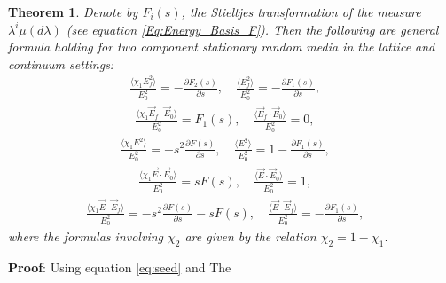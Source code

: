 \documentclass[english,12pt,jmp,graphicx]{revtex4-1}
\newtheorem{theorem}{Theorem}[section]
\begin{document}
% 
\begin{theorem}\label{thm:Herglotz_Decomp_Energy}
   Denote by $F_i(s)$, the Stieltjes transformation of the measure
   $\lambda^i\mu(d\lambda)$ (see equation \eqref{Eq:Energy_Basis_F}). Then the
   following are general formula holding for two component stationary  
   random media in the lattice and continuum settings: 
%
  \begin{align}\label{eq:Ed2_Energy_Partitions_Ef2}
  \frac{\langle\chi_1E_f^2\rangle}{E_0^2}=-\frac{\partial F_2(s)}{\partial s},   \quad
  \frac{\langle E_f^2\rangle}{E_0^2}=-\frac{\partial F_1(s)}{\partial s}, \quad
\end{align}  
%
  \begin{align}\label{eq:Ed2_Energy_Partitions_Ef*E0}
  \frac{ \langle\chi_1\vec{E}_f\cdot\vec{E}_0\rangle}{E_0^2}=F_1(s), \quad
  \frac{ \langle\vec{E}_f\cdot\vec{E}_0\rangle}{E_0^2}=0, \quad
  \end{align}
%
  \begin{align}\label{eq:Ed2_Energy_Partitions_E2}
   \frac{\langle\chi_1E^2\rangle}{E_0^2}=-s^2\frac{\partial F(s)}{\partial s}, \quad
   \frac{ \langle E^2\rangle}{E_0^2}=1-\frac{\partial F_1(s)}{\partial s}, \quad
  \end{align}
%
  \begin{align}\label{eq:Ed2_Energy_Partitions_E*E0}
    \frac{ \langle\chi_1\vec{E}\cdot\vec{E}_0\rangle}{E_0^2}=sF(s),\quad
    \frac{\langle\vec{E}\cdot\vec{E}_0\rangle}{E_0^2}=1,\quad
  \end{align}
%
  \begin{align}\label{eq:Ed2_Energy_Partitions_E*Ef}
    \frac{ \langle\chi_1\vec{E}\cdot\vec{E}_f\rangle}{E_0^2}=-s^2\frac{\partial F(s)}{\partial s}-sF(s),\quad
    \frac{\langle\vec{E}\cdot\vec{E}_f\rangle}{E_0^2}=-\frac{\partial F_1(s)}{\partial s},\quad
  \end{align}
%
  where the formulas involving $\chi_2$ are given by the relation $\chi_2=1-\chi_1$.
\end{theorem}
%
\noindent \textbf{Proof}:
  Using equation \eqref{eq:seed} and The
\end{document}
